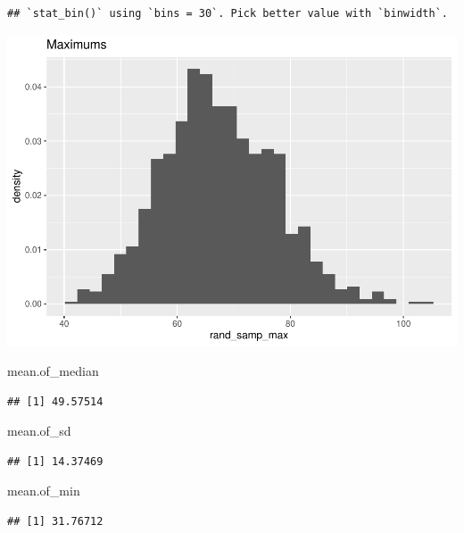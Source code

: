 \documentclass[
]{article}
\newenvironment{Shaded}{\begin{snugshade}}{\end{snugshade}}
\newcommand{\NormalTok}[1]{#1}
\begin{document}
\begin{verbatim}
## `stat_bin()` using `bins = 30`. Pick better value with `binwidth`.
\end{verbatim}

\includegraphics{Class_Exercises_ClassNotes_5_files/figure-latex/unnamed-chunk-8-1.pdf}

\begin{Shaded}
\begin{Highlighting}[]
\NormalTok{mean.of\_median}
\end{Highlighting}
\end{Shaded}

\begin{verbatim}
## [1] 49.57514
\end{verbatim}

\begin{Shaded}
\begin{Highlighting}[]
\NormalTok{mean.of\_sd}
\end{Highlighting}
\end{Shaded}

\begin{verbatim}
## [1] 14.37469
\end{verbatim}

\begin{Shaded}
\begin{Highlighting}[]
\NormalTok{mean.of\_min}
\end{Highlighting}
\end{Shaded}

\begin{verbatim}
## [1] 31.76712
\end{verbatim}
\end{document}
